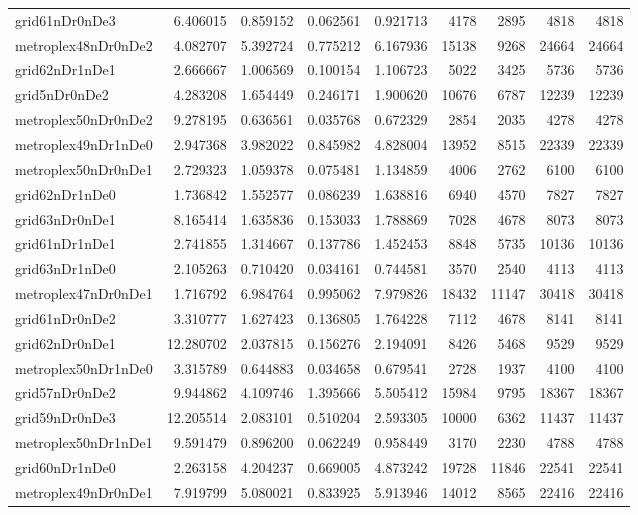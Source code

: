\begin{longtable}{|l|r|r|r|r|r|r|r|r|}
grid61nDr0nDe3 & 6.406015 & 0.859152 & 0.062561 & 0.921713 & 4178 & 2895 & 4818 & 4818 \\
metroplex48nDr0nDe2 & 4.082707 & 5.392724 & 0.775212 & 6.167936 & 15138 & 9268 & 24664 & 24664 \\
grid62nDr1nDe1 & 2.666667 & 1.006569 & 0.100154 & 1.106723 & 5022 & 3425 & 5736 & 5736 \\
grid5nDr0nDe2 & 4.283208 & 1.654449 & 0.246171 & 1.900620 & 10676 & 6787 & 12239 & 12239 \\
metroplex50nDr0nDe2 & 9.278195 & 0.636561 & 0.035768 & 0.672329 & 2854 & 2035 & 4278 & 4278 \\
metroplex49nDr1nDe0 & 2.947368 & 3.982022 & 0.845982 & 4.828004 & 13952 & 8515 & 22339 & 22339 \\
metroplex50nDr0nDe1 & 2.729323 & 1.059378 & 0.075481 & 1.134859 & 4006 & 2762 & 6100 & 6100 \\
grid62nDr1nDe0 & 1.736842 & 1.552577 & 0.086239 & 1.638816 & 6940 & 4570 & 7827 & 7827 \\
grid63nDr0nDe1 & 8.165414 & 1.635836 & 0.153033 & 1.788869 & 7028 & 4678 & 8073 & 8073 \\
grid61nDr1nDe1 & 2.741855 & 1.314667 & 0.137786 & 1.452453 & 8848 & 5735 & 10136 & 10136 \\
grid63nDr1nDe0 & 2.105263 & 0.710420 & 0.034161 & 0.744581 & 3570 & 2540 & 4113 & 4113 \\
metroplex47nDr0nDe1 & 1.716792 & 6.984764 & 0.995062 & 7.979826 & 18432 & 11147 & 30418 & 30418 \\
grid61nDr0nDe2 & 3.310777 & 1.627423 & 0.136805 & 1.764228 & 7112 & 4678 & 8141 & 8141 \\
grid62nDr0nDe1 & 12.280702 & 2.037815 & 0.156276 & 2.194091 & 8426 & 5468 & 9529 & 9529 \\
metroplex50nDr1nDe0 & 3.315789 & 0.644883 & 0.034658 & 0.679541 & 2728 & 1937 & 4100 & 4100 \\
grid57nDr0nDe2 & 9.944862 & 4.109746 & 1.395666 & 5.505412 & 15984 & 9795 & 18367 & 18367 \\
grid59nDr0nDe3 & 12.205514 & 2.083101 & 0.510204 & 2.593305 & 10000 & 6362 & 11437 & 11437 \\
metroplex50nDr1nDe1 & 9.591479 & 0.896200 & 0.062249 & 0.958449 & 3170 & 2230 & 4788 & 4788 \\
grid60nDr1nDe0 & 2.263158 & 4.204237 & 0.669005 & 4.873242 & 19728 & 11846 & 22541 & 22541 \\
metroplex49nDr0nDe1 & 7.919799 & 5.080021 & 0.833925 & 5.913946 & 14012 & 8565 & 22416 & 22416 \\

\end{longtable}
